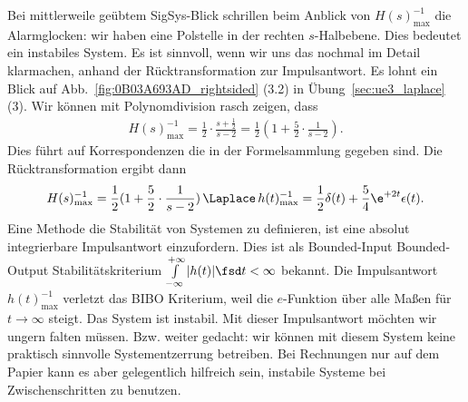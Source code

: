 \begin{ExCalc}
Bei mittlerweile geübtem SigSys-Blick schrillen beim Anblick von
$H(s)_\mathrm{max}^{-1}$
die Alarmglocken: wir haben eine Polstelle in der rechten $s$-Halbebene.
Dies bedeutet ein instabiles System.
Es ist sinnvoll, wenn wir uns das nochmal im Detail klarmachen, anhand der
Rücktransformation zur Impulsantwort.
Es lohnt ein Blick auf Abb.~\ref{fig:0B03A693AD_rightsided} (3.2) in Übung~\ref{sec:ue3_laplace} (3).
%
Wir können mit Polynomdivision rasch zeigen, dass
\begin{align}
H(s)_\mathrm{max}^{-1} = \frac{1}{2}\cdot\frac{s+\frac{1}{2}}{s-2}
= \frac{1}{2} ( 1 + \frac{5}{2}\cdot\frac{1}{s-2}).
\end{align}
Dies führt auf Korrespondenzen die in der Formelsammlung gegeben
sind.
Die Rücktransformation ergibt dann
\begin{align}
H(s)_\mathrm{max}^{-1} = \frac{1}{2} ( 1 + \frac{5}{2}\cdot\frac{1}{s-2})
\,\Laplace\,
h(t)_\mathrm{max}^{-1} = \frac{1}{2}\delta(t) + \frac{5}{4}\e^{+2 t}\epsilon(t).
\end{align}
%
Eine Methode die Stabilität von Systemen zu definieren, ist eine absolut
integrierbare Impulsantwort einzufordern. Dies ist als Bounded-Input Bounded-Output
Stabilitätskriterium
$\int\limits_{-\infty}^{+\infty} |h(t)|\fsd t < \infty$
bekannt.
Die Impulsantwort $h(t)_\mathrm{max}^{-1} $ verletzt das BIBO Kriterium, weil
die $e$-Funktion über alle Maßen für $t\to\infty$ steigt. Das System ist
instabil.
Mit dieser Impulsantwort möchten wir ungern falten müssen.
Bzw. weiter gedacht: wir können mit diesem System keine praktisch sinnvolle
Systementzerrung betreiben.
%
Bei Rechnungen nur auf dem Papier kann es aber gelegentlich hilfreich sein,
instabile Systeme bei Zwischenschritten zu benutzen.
\end{ExCalc}

